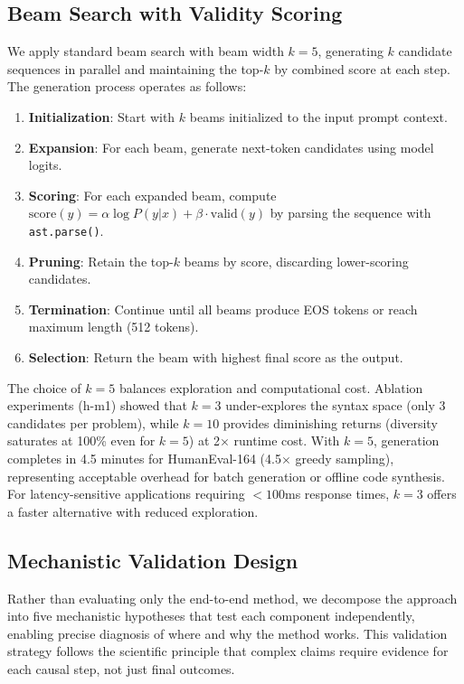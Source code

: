 \subsection{Beam Search with Validity Scoring}

We apply standard beam search \cite{Graves2012} with beam width $k=5$, generating $k$ candidate sequences in parallel and maintaining the top-$k$ by combined score at each step. The generation process operates as follows:

\begin{enumerate}
\item \textbf{Initialization}: Start with $k$ beams initialized to the input prompt context.
\item \textbf{Expansion}: For each beam, generate next-token candidates using model logits.
\item \textbf{Scoring}: For each expanded beam, compute $\text{score}(y) = \alpha \log P(y|x) + \beta \cdot \text{valid}(y)$ by parsing the sequence with \texttt{ast.parse()}.
\item \textbf{Pruning}: Retain the top-$k$ beams by score, discarding lower-scoring candidates.
\item \textbf{Termination}: Continue until all beams produce EOS tokens or reach maximum length (512 tokens).
\item \textbf{Selection}: Return the beam with highest final score as the output.
\end{enumerate}

The choice of $k=5$ balances exploration and computational cost. Ablation experiments (h-m1) showed that $k=3$ under-explores the syntax space (only 3 candidates per problem), while $k=10$ provides diminishing returns (diversity saturates at 100\% even for $k=5$) at 2$\times$ runtime cost. With $k=5$, generation completes in 4.5 minutes for HumanEval-164 (4.5$\times$ greedy sampling), representing acceptable overhead for batch generation or offline code synthesis. For latency-sensitive applications requiring $<100$ms response times, $k=3$ offers a faster alternative with reduced exploration.

\subsection{Mechanistic Validation Design}

Rather than evaluating only the end-to-end method, we decompose the approach into five mechanistic hypotheses that test each component independently, enabling precise diagnosis of where and why the method works. This validation strategy follows the scientific principle that complex claims require evidence for each causal step, not just final outcomes.

